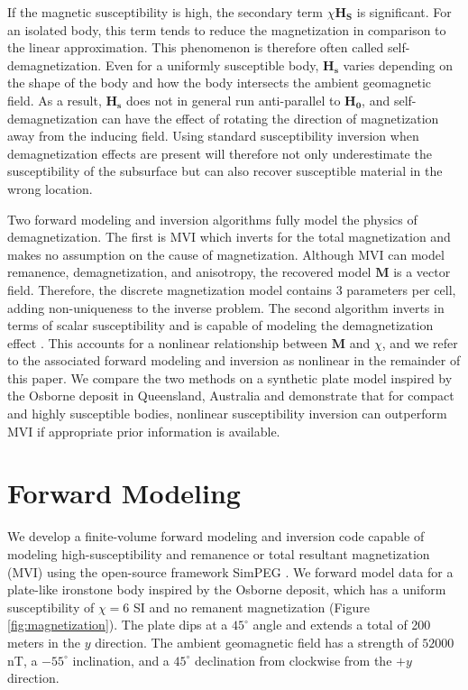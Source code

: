 \documentclass{segabs}
\begin{document}
If the magnetic susceptibility is high, the secondary term $\chi \mathbf{H_S}$ is significant. For an isolated body, this term tends to reduce the magnetization in comparison to the linear approximation. This phenomenon is therefore often called self-demagnetization.  Even for a uniformly susceptible body, $\mathbf{H_s}$ varies depending on the shape of the body and how the body intersects the ambient geomagnetic field.  As a result, $\mathbf{H_s}$ does not in general run anti-parallel to $\mathbf{H_0}$, and self-demagnetization can have the effect of rotating the direction of magnetization away from the inducing field. Using standard susceptibility inversion when demagnetization effects are present will therefore not only underestimate the susceptibility of the subsurface but can also recover susceptible material in the wrong location.

Two forward modeling and inversion algorithms fully model the physics of demagnetization. The first is MVI \citep{Lelievre2009} which inverts for the total magnetization and makes no assumption on the cause of magnetization. Although MVI can model remanence, demagnetization, and anisotropy, the recovered model $\mathbf{M}$ is a vector field. Therefore, the discrete magnetization model contains 3 parameters per cell, adding non-uniqueness to the inverse problem.  The second algorithm inverts in terms of scalar susceptibility and is capable of modeling the demagnetization effect \citep{Lelievre2006}.  This accounts for a  nonlinear relationship between $\mathbf{M}$ and $\chi$, and we refer to the associated forward modeling and inversion as nonlinear in the remainder of this paper. We compare the two methods on a synthetic plate model inspired by the Osborne deposit in Queensland, Australia and demonstrate that for compact and highly susceptible bodies, nonlinear susceptibility inversion can outperform MVI if appropriate prior information is available.

\section{Forward Modeling}

We develop a finite-volume forward modeling and inversion code capable of modeling high-susceptibility and remanence or total resultant magnetization (MVI) using the open-source framework SimPEG \citep{Cockett2015}. We forward model data for a plate-like ironstone body inspired by the Osborne deposit, which has a uniform susceptibility of $\chi=6$ SI and no remanent magnetization (Figure \ref{fig:magnetization}). The plate dips at a $45^{\circ}$ angle and extends a total of 200 meters in the $y$ direction.  The ambient geomagnetic field has a strength of $52000$nT, a $-55^{\circ}$ inclination, and a $45^{\circ}$ declination from clockwise from the $+y$ direction.
\end{document}
